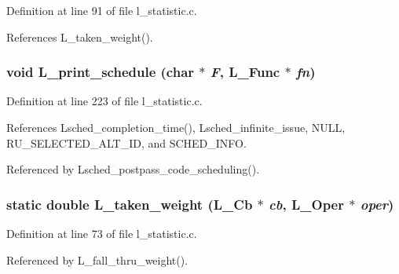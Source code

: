 Definition at line 91 of file l\_\-statistic.c.

References L\_\-taken\_\-weight().
\subsubsection{\setlength{\rightskip}{0pt plus 5cm}void L\_\-print\_\-schedule (char $\ast$ {\em F}, L\_\-Func $\ast$ {\em fn})}\label{l__statistic_8c_436ebb2a3d9d135acb6558e1920d3555}




Definition at line 223 of file l\_\-statistic.c.

References Lsched\_\-completion\_\-time(), Lsched\_\-infinite\_\-issue, NULL, RU\_\-SELECTED\_\-ALT\_\-ID, and SCHED\_\-INFO.

Referenced by Lsched\_\-postpass\_\-code\_\-scheduling().
\subsubsection{\setlength{\rightskip}{0pt plus 5cm}static double L\_\-taken\_\-weight (L\_\-Cb $\ast$ {\em cb}, L\_\-Oper $\ast$ {\em oper})\hspace{0.3cm}{\tt  [static]}}\label{l__statistic_8c_676e6fd479545e262b123f73c2d6a98f}




Definition at line 73 of file l\_\-statistic.c.

Referenced by L\_\-fall\_\-thru\_\-weight().